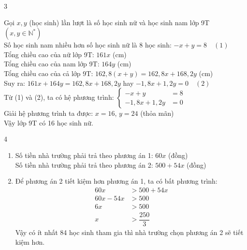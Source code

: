 \begin{Solbook}{3}
 \par \noindent  Gọi $x, y$ (học sinh) lần lượt là số học sinh nữ và học sinh nam lớp 9T $(x,y \in \mathbb {N^*})$\\ Số học sinh nam nhiều hơn số học sinh nữ là 8 học sinh: $-x+y=8 \quad (1)$\\ Tổng chiều cao của nữ lớp 9T: $161x$ (cm)\\ Tổng chiều cao của nam lớp 9T: $164y$ (cm)\\ Tổng chiều cao của cả lớp 9T: $162{,}8(x+y)=162{,}8x+168{,}2y$ (cm)\\ Suy ra: $161x+164y=162{,}8x+168{,}2y$ hay $-1{,}8x+1{,}2y=0 \quad (2)$\\ Từ (1) và (2), ta có hệ phương trình: $\begin {cases} -x+y&=8\\ -1{,}8x+1{,}2y&=0 \end {cases}$ \\ Giải hệ phương trình ta được: $x=16$, $y=24$ (thỏa mãn)\\ Vậy lớp 9T có 16 học sinh nữ. \par  \hfill \qedEX 
\end{Solbook}
\begin{Solbook}{4}
 \par \noindent  \begin {enumerate} \item Số tiền nhà trường phải trả theo phương án 1: $60x$ (đồng)\\ Số tiền nhà trường phải trả theo phương án 2: $500+54x$ (đồng) \item Để phương án 2 tiết kiệm hơn phương án 1, ta có bất phương trình: \begin {align*} 60x&>500+54x\\ 60x-54x&>500\\ 6x&>500\\ x&>\dfrac {250}{3} \end {align*} Vậy có ít nhất 84 học sinh tham gia thì nhà trường chọn phương án 2 sẽ tiết kiệm hơn. \end {enumerate}  \hfill \qedEX 
\end{Solbook}
